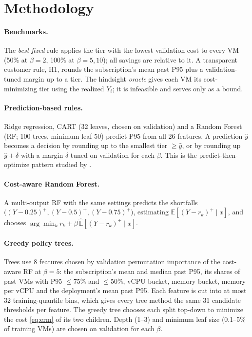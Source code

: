 \documentclass[10pt]{article}
\newcommand{\Ex}{\mathbb{E}}
\begin{document}
\section{Methodology}
\label{sec:methods}

\paragraph{Benchmarks.} The \emph{best fixed} rule applies the tier with the lowest validation cost to every VM (50\% at $\beta=2$, 100\% at $\beta=5,10$); all savings are relative to it. A transparent customer rule, H1, rounds the subscription's mean past P95 plus a validation-tuned margin up to a tier. The hindsight \emph{oracle} gives each VM its cost-minimizing tier using the realized $Y_i$; it is infeasible and serves only as a bound.

\paragraph{Prediction-based rules.} Ridge regression, CART (32 leaves, chosen on validation) and a Random Forest (RF; 100 trees, minimum leaf 50) \citep{breiman2001rf} predict P95 from all 26 features. A prediction $\hat y$ becomes a decision by rounding up to the smallest tier $\ge\hat y$, or by rounding up $\hat y+\delta$ with a margin $\delta$ tuned on validation for each $\beta$. This is the predict-then-optimize pattern studied by \citet{elmachtoub2022spo}.

\paragraph{Cost-aware Random Forest.} A multi-output RF with the same settings predicts the shortfalls $\big((Y-0.25)^+,(Y-0.5)^+,(Y-0.75)^+\big)$, estimating $\Ex[(Y-r_k)^+\mid x]$, and chooses $\arg\min_k r_k+\beta\,\widehat{\Ex}[(Y-r_k)^+\mid x]$.

\paragraph{Greedy policy trees.} Trees use 8 features chosen by validation permutation importance of the cost-aware RF at $\beta=5$: the subscription's mean and median past P95, its shares of past VMs with P95 $\le75\%$ and $\le50\%$, vCPU bucket, memory bucket, memory per vCPU and the deployment's mean past P95. Each feature is cut into at most 32 training-quantile bins, which gives every tree method the same 31 candidate thresholds per feature. The greedy tree chooses each split top-down to minimize the cost \eqref{eq:erm} of its two children. Depth (1--3) and minimum leaf size (0.1--5\% of training VMs) are chosen on validation for each $\beta$.
\end{document}
